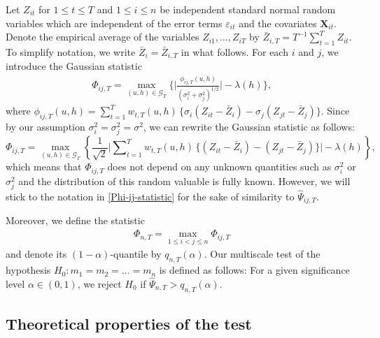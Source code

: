 \documentclass[a4paper,12pt]{article}
\begin{document}
Let $Z_{it}$ for $1 \le t \le T$ and $1 \le i \le n$ be independent standard normal random variables which are independent of the error terms $\varepsilon_{it}$ and the covariates $\mathbf{X}_{it}$. Denote the empirical average of the variables $Z_{i1},\ldots,Z_{iT}$ by $\bar{Z}_{i,T} = T^{-1} \sum_{t=1}^T Z_{it}$. To simplify notation, we write $\bar{Z}_i = \bar{Z}_{i,T}$ in what follows. For each $i$ and $j$, we introduce the Gaussian statistic 
\begin{align}\label{Phi-ij-statistic}
\Phi_{ij,T} = \max_{(u,h) \in \mathcal{G}_T} \Big\{ \Big|\frac{\phi_{ij,T}(u,h)}{(\sigma_i^2 + \sigma_j^2)^{1/2}}\Big| - \lambda(h) \Big\},
\end{align}
where $\phi_{ij,T}(u,h) = \sum\nolimits_{t=1}^T w_{t,T}(u,h) \, \big\{ \sigma_i (Z_{it} - \bar{Z}_i) - \sigma_j (Z_{jt} - \bar{Z}_j) \big\}$. Since by our assumption $\sigma_i^2 = \sigma^2_j = \sigma^2$, we can rewrite the Gaussian statistic as follows:
\[\Phi_{ij,T} = \max_{(u,h) \in \mathcal{G}_T} \left\{\frac{1}{\sqrt{2}} \Big|\sum\nolimits_{t=1}^T w_{t,T}(u,h) \, \big\{ (Z_{it} - \bar{Z}_i) - (Z_{jt} - \bar{Z}_j) \big\}\Big| - \lambda(h) \right\}, \] 
which means that $\Phi_{ij,T}$ does not depend on any unknown quantities such as $\sigma^2_i$ or $\sigma_j^2$ and the distribution of this random valuable is fully known. However, we will stick to the notation in \eqref{Phi-ij-statistic} for the sake of similarity to $\widehat{\Psi}_{ij,T}$.

Moreover, we define the statistic
\begin{align}\label{Phi-statistic}
\Phi_{n,T} = \max_{1 \le i < j \le n} \Phi_{ij,T}
\end{align}
and denote its $(1-\alpha)$-quantile by $q_{n,T}(\alpha)$. Our multiscale test of the hypothesis $H_0: m_1 = m_2 = \ldots = m_n$ is defined as follows: For a given significance level $\alpha \in (0,1)$, we reject $H_0$ if $\widehat{\Psi}_{n,T} > q_{n,T}(\alpha)$. 


\subsection{Theoretical properties of the test}\label{subsec-test-theo}
\end{document}
